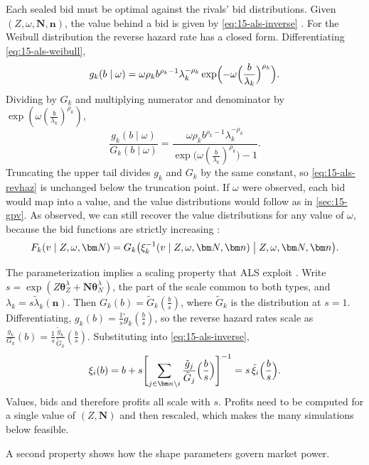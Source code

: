 Each sealed bid must be optimal against the rivals' bid distributions. Given $(Z,\omega,\bm N,\bm n)$, the
value behind a bid is given by \eqref{eq:15-als-inverse} \citep[eq.~(9)]{AtheyLevinSeira2011}. For the
Weibull distribution the reverse hazard rate has a closed form. Differentiating
\eqref{eq:15-als-weibull},
\[
g_k(b\mid\omega)=\omega\rho_kb^{\rho_k-1}\lambda_k^{-\rho_k}\exp\Bigl(-\omega\Bigl(\frac{b}{\lambda_k}\Bigr)^{\rho_k}\Bigr).
\]
Dividing by $G_k$ and multiplying numerator and denominator by $\exp(\omega(\frac{b}{\lambda_k})^{\rho_k})$,
\begin{equation}\label{eq:15-als-revhaz}
\frac{g_k(b\mid\omega)}{G_k(b\mid\omega)}=\frac{\omega\rho_kb^{\rho_k-1}\lambda_k^{-\rho_k}}{\exp\bigl(\omega(\frac{b}{\lambda_k})^{\rho_k}\bigr)-1}.
\end{equation}
Truncating the upper tail divides $g_k$ and $G_k$ by the same constant, so \eqref{eq:15-als-revhaz} is
unchanged below the truncation point. If $\omega$ were observed, each bid would map into a value, and the
value distributions would follow as in \cref{sec:15-gpv}. As \citet{Krasnokutskaya2011} observed, we can
still recover the value distributions for any value of $\omega$, because the bid functions are strictly
increasing \citep[eq.~(10)]{AtheyLevinSeira2011}:
\begin{equation}\label{eq:15-als-F}
F_k(v\mid Z,\omega,\bm N)=G_k\bigl(\xi_k^{-1}(v\mid Z,\omega,\bm N,\bm n)\bigm|Z,\omega,\bm N,\bm n\bigr).
\end{equation}

The parameterization implies a scaling property that ALS exploit \citep[p.~243]{AtheyLevinSeira2011}.
Write $s=\exp(Z\bm\theta^\lambda_Z+\bm N\bm\theta^\lambda_N)$, the part of the scale common to both
types, and $\lambda_k=s\tilde\lambda_k(\bm n)$. Then $G_k(b)=\tilde G_k(\frac{b}{s})$, where $\tilde G_k$ is
the distribution at $s=1$. Differentiating, $g_k(b)=\frac{1}{s}\tilde g_k(\frac{b}{s})$, so the reverse
hazard rates scale as $\frac{g_k}{G_k}(b)=\frac{1}{s}\frac{\tilde g_k}{\tilde G_k}(\frac{b}{s})$.
Substituting into \eqref{eq:15-als-inverse},
\[
\xi_i(b)=b+s\Biggl[\sum_{j\in\bm n\setminus i}\frac{\tilde g_j}{\tilde G_j}\Bigl(\frac{b}{s}\Bigr)\Biggr]^{-1}
=s\,\tilde\xi_i\Bigl(\frac{b}{s}\Bigr).
\]
Values, bids and therefore profits all scale with $s$. Profits need to be computed for a single value of
$(Z,\bm N)$ and then rescaled, which makes the many simulations below feasible.

A second property shows how the shape parameters govern market power.

